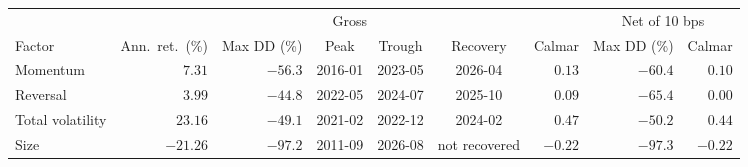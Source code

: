 \begin{tabular}{lrrcccrrr}
\toprule
& \multicolumn{6}{c}{Gross} & \multicolumn{2}{c}{Net of 10 bps} \\
\cmidrule(lr){2-7} \cmidrule(lr){8-9}
Factor & Ann.\ ret.\ (\%) & Max DD (\%) & Peak & Trough & Recovery & Calmar & Max DD (\%) & Calmar \\
\midrule
Momentum & $7.31$ & $-56.3$ & 2016-01 & 2023-05 & 2026-04 & $0.13$ & $-60.4$ & $0.10$ \\
Reversal & $3.99$ & $-44.8$ & 2022-05 & 2024-07 & 2025-10 & $0.09$ & $-65.4$ & $0.00$ \\
Total volatility & $23.16$ & $-49.1$ & 2021-02 & 2022-12 & 2024-02 & $0.47$ & $-50.2$ & $0.44$ \\
Size & $-21.26$ & $-97.2$ & 2011-09 & 2026-08 & not recovered & $-0.22$ & $-97.3$ & $-0.22$ \\
\bottomrule
\end{tabular}
